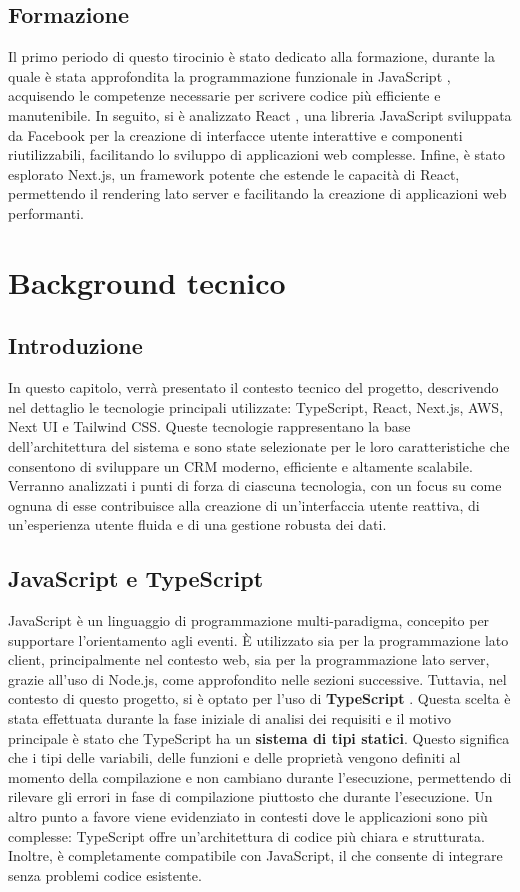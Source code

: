 \documentclass[target=bach,aauheader=,style=]{thud}
\begin{document}
\section{Formazione}
Il primo periodo di questo tirocinio è stato dedicato alla formazione, durante la quale è stata approfondita la programmazione funzionale in JavaScript \cite{knowthen2024}, acquisendo le competenze necessarie per scrivere codice più efficiente e manutenibile. In seguito, si è analizzato React \cite{udemyreactredux2024}, una libreria JavaScript sviluppata da Facebook per la creazione di interfacce utente interattive e componenti riutilizzabili, facilitando lo sviluppo di applicazioni web complesse. Infine, è stato esplorato Next.js, un framework potente che estende le capacità di React, permettendo il rendering lato server e facilitando la creazione di applicazioni web performanti.

\chapter{Background tecnico}

\section{Introduzione}
In questo capitolo, verrà presentato il contesto tecnico del progetto, descrivendo nel dettaglio le tecnologie principali utilizzate: TypeScript, React, Next.js, AWS, Next UI e Tailwind CSS. Queste tecnologie rappresentano la base dell'architettura del sistema e sono state selezionate per le loro caratteristiche che consentono di sviluppare un CRM moderno, efficiente e altamente scalabile. Verranno analizzati i punti di forza di ciascuna tecnologia, con un focus su come ognuna di esse contribuisce alla creazione di un'interfaccia utente reattiva, di un'esperienza utente fluida e di una gestione robusta dei dati.

\section{JavaScript e TypeScript}
JavaScript \cite{wikipedia:javascript} è un linguaggio di programmazione multi-paradigma, concepito per supportare l'orientamento agli eventi. È utilizzato sia per la programmazione lato client, principalmente nel contesto web, sia per la programmazione lato server, grazie all'uso di Node.js, come approfondito nelle sezioni successive. Tuttavia, nel contesto di questo progetto, si è optato per l'uso di \textbf{TypeScript} \cite{wikipedia:typescript}. Questa scelta è stata effettuata durante la fase iniziale di analisi dei requisiti e il motivo principale è stato che TypeScript ha un \textbf{sistema di tipi statici}. Questo significa che i tipi delle variabili, delle funzioni e delle proprietà vengono definiti al momento della compilazione e non cambiano durante l'esecuzione, permettendo di rilevare gli errori in fase di compilazione piuttosto che durante l'esecuzione. Un altro punto a favore viene evidenziato in contesti dove le applicazioni sono più complesse: TypeScript offre un'architettura di codice più chiara e strutturata. Inoltre, è completamente compatibile con JavaScript, il che consente di integrare senza problemi codice esistente.
\end{document}
